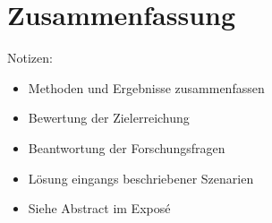 \chapter{Zusammenfassung}
\thispagestyle{fancy}
\label{chap:Zusammenfassung}

Notizen:
\begin{itemize}
	\item Methoden und Ergebnisse zusammenfassen
	\item Bewertung der Zielerreichung
	\item Beantwortung der Forschungsfragen
	\item Lösung eingangs beschriebener Szenarien
	\item Siehe Abstract im Exposé
\end{itemize}

